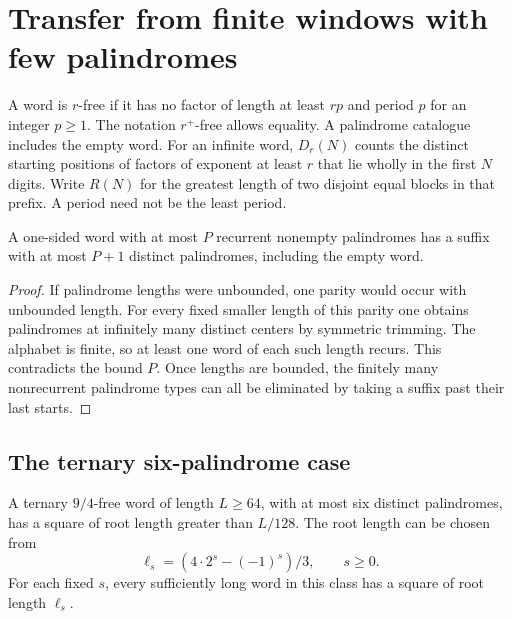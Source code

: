 \section{Transfer from finite windows with few palindromes}
\label{sec:few-palindromes}

A word is \(r\)-free if it has no factor of length at least \(rp\) and period \(p\) for an integer \(p\ge1\). The notation \(r^+\)-free allows equality. A palindrome catalogue includes the empty word. For an infinite word, \(D_r(N)\) counts the distinct starting positions of factors of exponent at least \(r\) that lie wholly in the first \(N\) digits. Write \(R(N)\) for the greatest length of two disjoint equal blocks in that prefix. A period need not be the least period.

\begin{lemma}\label{lem:pal-catalogue-cut}
A one-sided word with at most \(P\) recurrent nonempty palindromes has a suffix with at most \(P+1\) distinct palindromes, including the empty word.
\end{lemma}

\begin{proof}
If palindrome lengths were unbounded, one parity would occur with unbounded length. For every fixed smaller length of this parity one obtains palindromes at infinitely many distinct centers by symmetric trimming. The alphabet is finite, so at least one word of each such length recurs. This contradicts the bound \(P\). Once lengths are bounded, the finitely many nonrecurrent palindrome types can all be eliminated by taking a suffix past their last starts.
\end{proof}

\subsection{The ternary six-palindrome case}

\begin{theorem}\label{thm:six-pal}
A ternary \(9/4\)-free word of length \(L\ge64\), with at most six distinct palindromes, has a square of root length greater than \(L/128\). The root length can be chosen from
\[
                \ell_s=(4\cdot2^s-(-1)^s)/3,\qquad s\ge0.
\]
For each fixed \(s\), every sufficiently long word in this class has a square of root length \(\ell_s\).
\end{theorem}

